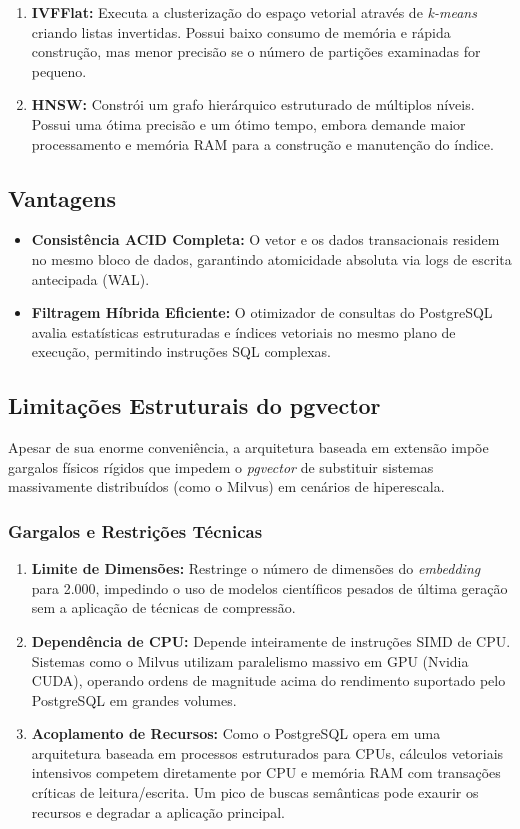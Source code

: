 \documentclass[a4paper, 12pt]{article}
\begin{document}
\begin{enumerate}
    \item \textbf{IVFFlat:} Executa a clusterização do espaço vetorial através de \textit{k-means} criando listas invertidas. Possui baixo consumo de memória e rápida construção, mas menor precisão se o número de partições examinadas for pequeno.
    \item \textbf{HNSW:} Constrói um grafo hierárquico estruturado de múltiplos níveis. Possui uma ótima precisão e um ótimo tempo, embora demande maior processamento e memória RAM para a construção e manutenção do índice.
\end{enumerate}

\subsection{Vantagens}
\begin{itemize}
    \item \textbf{Consistência ACID Completa:} O vetor e os dados transacionais residem no mesmo bloco de dados, garantindo atomicidade absoluta via logs de escrita antecipada (WAL).
    \item \textbf{Filtragem Híbrida Eficiente:} O otimizador de consultas do PostgreSQL avalia estatísticas estruturadas e índices vetoriais no mesmo plano de execução, permitindo instruções SQL complexas.
\end{itemize}

\subsection{Limitações Estruturais do pgvector}
Apesar de sua enorme conveniência, a arquitetura baseada em extensão impõe gargalos físicos rígidos que impedem o \textit{pgvector} de substituir sistemas massivamente distribuídos (como o Milvus) em cenários de hiperescala.

\subsubsection{Gargalos e Restrições Técnicas}
\begin{enumerate}
    \item \textbf{Limite de Dimensões:} Restringe o número de dimensões do \textit{embedding} para 2.000, impedindo o uso de modelos científicos pesados de última geração sem a aplicação de técnicas de compressão.
    \item \textbf{Dependência de CPU:} Depende inteiramente de instruções SIMD de CPU. Sistemas como o Milvus utilizam paralelismo massivo em GPU (Nvidia CUDA), operando ordens de magnitude acima do rendimento suportado pelo PostgreSQL em grandes volumes.
    \item \textbf{Acoplamento de Recursos:} Como o PostgreSQL opera em uma arquitetura baseada em processos estruturados para CPUs, cálculos vetoriais intensivos competem diretamente por CPU e memória RAM com transações críticas de leitura/escrita. Um pico de buscas semânticas pode exaurir os recursos e degradar a aplicação principal.
\end{enumerate}
\end{document}
